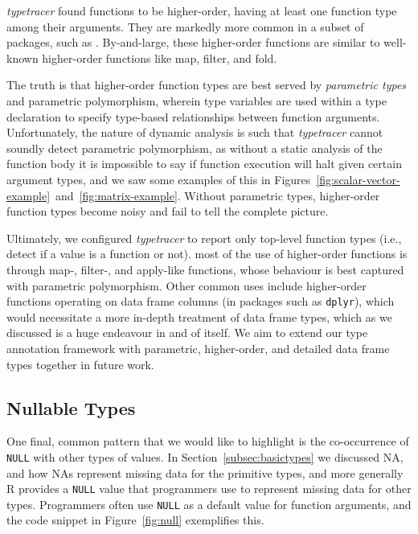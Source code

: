 \documentclass[acmsmall,review,anonymous]{acmart}\settopmatter{printfolios=true,printccs=false,printacmref=false}
\newcommand{\code}[1]{{\lstinline[style=Rin]!#1!}\xspace}
\newcommand{\typetracer}{\emph{typetracer}\xspace} %
\begin{document}
\typetracer found  functions to be higher-order, having at least one function type among their arguments.
They are markedly more common in a subset of packages, such as .
By-and-large, these higher-order functions are similar to well-known higher-order functions like map, filter, and fold.

The truth is that higher-order function types are best served by {\it parametric types} and parametric polymorphism, wherein type variables are used within a type declaration to specify type-based relationships between function arguments.
Unfortunately, the nature of dynamic analysis is such that \typetracer cannot soundly detect parametric polymorphism, as without a static analysis of the function body it is impossible to say if function execution will halt given certain argument types, and we saw some examples of this in Figures~\ref{fig:scalar-vector-example}~and~\ref{fig:matrix-example}.
Without parametric types, higher-order function types become noisy and fail to tell the complete picture.

Ultimately, we configured \typetracer to report only top-level function types (i.e., detect if a value is a function or not).
 most of the use of higher-order functions is through map-, filter-, and apply-like functions, whose behaviour is best captured with parametric polymorphism.
Other common uses include higher-order functions operating on data frame columns (in packages such as \code{dplyr}), which would necessitate a more in-depth treatment of data frame types, which as we discussed is a huge endeavour in and of itself.
We aim to extend our type annotation framework with parametric, higher-order, and detailed data frame types together in future work.


%
%
%
%
\subsection{Nullable Types}

One final, common pattern that we would like to highlight is the co-occurrence of \code{NULL} with other types of values.
In Section~\ref{subsec:basictypes} we discussed NA, and how NAs represent missing data for the primitive types, and more generally R provides a \code{NULL} value that programmers use to represent missing data for other types.
Programmers often use \code{NULL} as a default value for function arguments, and the code snippet in Figure~\ref{fig:null} exemplifies this.
\end{document}
